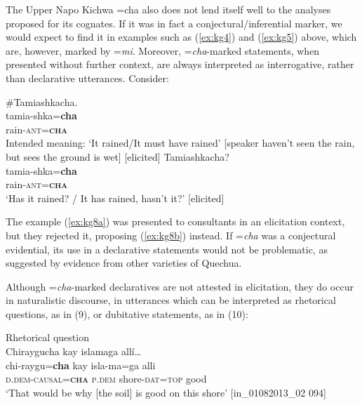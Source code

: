 \documentclass[output=paper]{langscibook}
\begin{document}
The Upper Napo Kichwa =cha also does not lend itself well to the analyses proposed for its cognates. If it was in fact a conjectural/inferential marker, we would expect to find it in examples such as (\ref{ex:kg4}) and (\ref{ex:kg5}) above, which are, however, marked by =\textit{mi}. Moreover, =\textit{cha}-marked statements, when presented without further context, are always interpreted as interrogative, rather than declarative utterances. Consider:

\begin{exe}
	\ex \label{ex:kg8}
	\begin{xlist}
		\ex \label{ex:kg8a}
		\glll \#Tamiashkacha.\\
		 tamia-shka=\textbf{cha}\\
		rain-\textsc{ant}=\textbf{\textsc{cha}}\\
		\trans Intended meaning: ‘It rained/It must have rained’ [speaker haven’t seen the rain, but 	sees the ground is wet] [elicited]
		\ex  \label{ex:kg8b}
		\glll Tamiashkacha?\\
		tamia-shka=\textbf{cha}\\
        rain-\textsc{ant}=\textbf{\textsc{cha}}\\
        \trans ‘Has it rained? / It has rained, hasn’t it?’ [elicited]
	\end{xlist}
\end{exe}


The example (\ref{ex:kg8a}) was presented to consultants in an elicitation context, but they rejected it, proposing (\ref{ex:kg8b}) instead. If =\textit{cha} was a conjectural evidential, its use in a declarative statements would not be problematic, as suggested by evidence from other varieties of Quechua. 

Although =\textit{cha}-marked declaratives are not attested in elicitation, they do occur in naturalistic discourse, in utterances which can be interpreted as rhetorical questions, as in (9), or dubitative statements, as in (10):

\begin{exe}
	\ex Rhetorical question\label{ex:kg9}\\
	\glll Chiraygucha kay islamaga allí…\\
	chi-raygu=\textbf{cha} kay isla-ma=ga alli\\
	\textsc{d}.\textsc{dem}-\textsc{causal}=\textbf{\textsc{cha}}	 \textsc{p}.\textsc{dem}	 shore-\textsc{dat}=\textsc{top} good\\
	\trans ‘That would be why [the soil] is good on this shore’ [in\_01082013\_02 094]
\end{exe}
\end{document}

